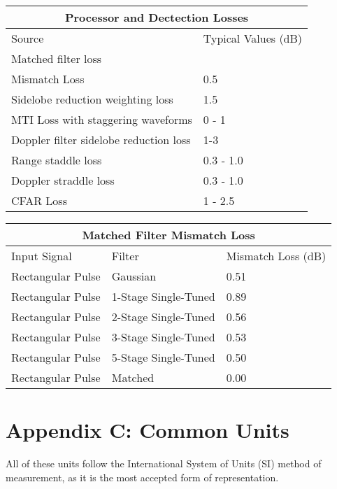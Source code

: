\documentclass[12pt]{article}
\begin{document}
\begin{center}
    \begin{tabular}{ |p{8cm}|p{4cm}|}
        \hline
            \multicolumn{2}{|c|}{Processor and Dectection Losses} \\
        \hline
            Source & Typical Values (dB) \\
        \hline
            Matched filter loss & \\
            Mismatch Loss & 0.5 \\
            Sidelobe reduction weighting loss & 1.5 \\
            MTI Loss with staggering waveforms & 0 - 1 \\
            Doppler filter sidelobe reduction loss & 1-3 \\
            Range staddle loss & 0.3 - 1.0 \\
            Doppler straddle loss & 0.3 - 1.0 \\
            CFAR Loss & 1 - 2.5 \\
        \hline
    \end{tabular}
\end{center}

\begin{center}
    \begin{tabular}{ |p{6cm}|p{5cm}|p{4cm}|}
        \hline
            \multicolumn{3}{|c|}{Matched Filter Mismatch Loss} \\
        \hline
            Input Signal & Filter & Mismatch Loss (dB) \\
        \hline
            Rectangular Pulse & Gaussian & 0.51 \\
            Rectangular Pulse & 1-Stage Single-Tuned & 0.89 \\
            Rectangular Pulse & 2-Stage Single-Tuned & 0.56 \\
            Rectangular Pulse & 3-Stage Single-Tuned & 0.53 \\
            Rectangular Pulse & 5-Stage Single-Tuned & 0.50 \\
            Rectangular Pulse & Matched & 0.00 \\
        \hline
    \end{tabular}
\end{center}

\section{Appendix C: Common Units}
All of these units follow the International System of Units (SI) method of measurement, as it is the most accepted form of representation. 
\end{document}
